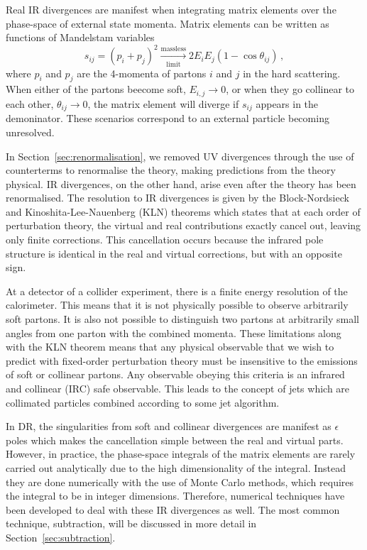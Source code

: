 \documentclass[main.tex]{subfiles}
\begin{document}
    Real IR divergences are manifest when integrating
    matrix elements over the phase-space of external state momenta.
    Matrix elements can be written as functions of Mandelstam variables
    \begin{equation}\label{eqn:mandelstam}
        s_{ij} = (p_{i} + p_{j})^{2} \xrightarrow[\mathrm{limit}]{\mathrm{massless}} 2 E_{i}E_{j}(1-\cos \theta_{ij}) \, ,
    \end{equation}
    where $p_{i}$ and $p_{j}$ are the 4-momenta of partons $i$ and $j$
    in the hard scattering.
    When either of the partons beecome soft, $E_{i,j}\rightarrow 0$,
    or when they go collinear to each other, $\theta_{ij} \rightarrow 0$,
    the matrix element will diverge if $s_{ij}$ appears
    in the demoninator. These scenarios correspond to an external
    particle becoming unresolved.

    In Section~\ref{sec:renormalisation}, we removed UV divergences
    through the use of counterterms to renormalise the theory, making
    predictions from the theory physical.
    IR divergences, on the other hand, arise even after the theory
    has been renormalised. The resolution to IR divergences is given by the
    Block-Nordsieck \cite{Bloch:1937pw,Yennie:1961ad} and Kinoshita-Lee-Nauenberg
    (KLN) theorems \cite{Kinoshita:1962ur,Lee:1964is} which states
    that at each order of perturbation theory, the virtual and real
    contributions exactly cancel out, leaving only finite corrections.
    This cancellation occurs because the infrared pole structure is
    identical in the real and virtual corrections, but with an opposite sign.

    At a detector of a collider experiment, there is a finite
    energy resolution of the calorimeter. This means that
    it is not physically possible to observe arbitrarily soft
    partons. It is also not possible to distinguish two partons
    at arbitrarily small angles from one parton with the combined
    momenta. These limitations along with the KLN theorem
    means that any physical observable that we wish to predict
    with fixed-order perturbation theory must be insensitive to the
    emissions of soft or collinear partons. Any observable obeying
    this criteria is an infrared and collinear (IRC) safe observable.
    This leads to the concept of jets \cite{Salam:2010nqg} which are collimated
    particles combined according to some jet algorithm.    

    In DR, the singularities from soft and collinear divergences
    are manifest as $\epsilon$ poles which makes the cancellation
    simple between the real and virtual parts. However, in practice, 
    the phase-space integrals of the matrix elements are rarely carried
    out analytically due to the high dimensionality of the integral.
    Instead they are done numerically with the use
    of Monte Carlo methods, which requires the integral to be in
    integer dimensions. Therefore, numerical techniques
    have been developed to deal with these IR divergences as well. The
    most common technique, subtraction, will be discussed in
    more detail in Section~\ref{sec:subtraction}.
    
\end{document}
